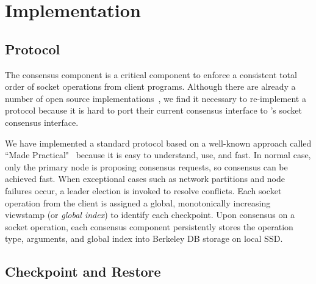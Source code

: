 \section{Implementation} \label{sec:impl}


\subsection{\paxos Protocol} \label{sec:paxos}
The \paxos consensus component is a critical component to enforce a consistent 
total order of socket operations from client programs. Although there are 
already a number of open source \paxos implementations~\cite{concoord, 
zookeeper, chubby:osdi, libpaxos}, we find it necessary to re-implement a 
\paxos protocol because it is hard to port their current consensus 
interface to \xxx's socket consensus interface.


We have implemented a standard \paxos protocol based on a well-known approach 
called ``\paxos Made Practical"~\cite{paxos:practical} because it is easy to 
understand, use, and fast. In normal case, only the primary node is proposing 
consensus requests, so consensus can be achieved fast. When exceptional cases 
such as network partitions and node failures occur, a \paxos leader election is 
invoked to resolve conflicts. Each socket operation from the client is assigned 
a global, monotonically increasing viewstamp (or \emph{global index}) to 
identify each checkpoint. Upon consensus on a socket operation, each consensus 
component persistently stores the operation type, arguments, and global index 
into Berkeley DB storage on local SSD.



\subsection{Checkpoint and Restore} \label{sec:checkpoint}


